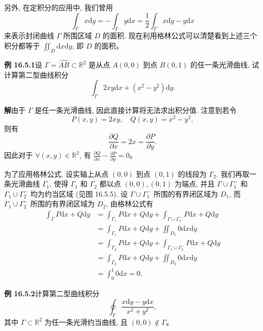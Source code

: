 \documentclass[UTF8,12pt,a4paper,fontset=fandol]{ctexart}
\begin{document}
另外, 在定积分的应用中, 我们曾用
\[
  \int_\Gamma x\mathrm dy=-\int_\Gamma y\mathrm dx
  =\frac12\int_\Gamma x\mathrm dy-y\mathrm dx
\]
来表示封闭曲线 $\Gamma$ 所围区域 $D$ 的面积. 现在利用格林公式可以清楚看到上述三个积分都等于 $\iint_D\mathrm dx\mathrm dy$, 即 $D$ 的面积。

\noindent\textbf{例 16.5.1}\quad 设 $\Gamma=\widehat{AB}\subset\mathbb R^2$ 是从点 $A(0,0)$ 到点 $B(0,1)$ 的任一条光滑曲线, 试计算第二型曲线积分
\[
  \int_\Gamma 2xy\mathrm dx+(x^2-y^2)\mathrm dy.
\]

\noindent\textbf{解}\quad 由于 $\Gamma$ 是任一条光滑曲线, 因此直接计算将无法求出积分值. 注意到若令
\[
  P(x,y)=2xy,\quad Q(x,y)=x^2-y^2,
\]
则有
\[
  \frac{\partial Q}{\partial x}=2x=\frac{\partial P}{\partial y}.
\]
因此对于 $\forall(x,y)\in\mathbb R^2$, 有 $\frac{\partial Q}{\partial x}-\frac{\partial P}{\partial y}=0$。

为了应用格林公式, 设实轴上从点 $(0,0)$ 到点 $(0,1)$ 的线段为 $\Gamma_2$. 我们再取一条光滑曲线 $\Gamma_1$, 使得 $\Gamma_1$ 和 $\Gamma_2$ 都以点 $(0,0),(0,1)$ 为端点, 并且 $\Gamma\cup\Gamma_1^-$ 和 $\Gamma_1\cup\Gamma_2^-$ 均为约当区域 (见图 16.5.5). 设 $\Gamma\cup\Gamma_1^-$ 所围的有界闭区域为 $D_1$, 而 $\Gamma_1\cup\Gamma_2^-$ 所围的有界闭区域为 $D_2$, 由格林公式有
\[
\begin{aligned}
  \int_\Gamma P\mathrm dx+Q\mathrm dy
  &=\int_{\Gamma_1}P\mathrm dx+Q\mathrm dy+\int_{\Gamma\cup\Gamma_1^-}P\mathrm dx+Q\mathrm dy\\
  &=\int_{\Gamma_1}P\mathrm dx+Q\mathrm dy+\iint_{D_1}0\mathrm dx\mathrm dy\\
  &=\int_{\Gamma_2}P\mathrm dx+Q\mathrm dy+\int_{\Gamma_1\cup\Gamma_2^-}P\mathrm dx+Q\mathrm dy\\
  &=\int_{\Gamma_2}P\mathrm dx+Q\mathrm dy+\iint_{D_2}0\mathrm dx\mathrm dy\\
  &=\int_0^1 0\mathrm dx=0.
\end{aligned}
\]

\noindent\textbf{例 16.5.2}\quad 计算第二型曲线积分
\[
  \oint_\Gamma\frac{x\mathrm dy-y\mathrm dx}{x^2+y^2},
\]
其中 $\Gamma\subset\mathbb R^2$ 为任一条光滑约当曲线, 且 $(0,0)\notin\Gamma$。
\end{document}
